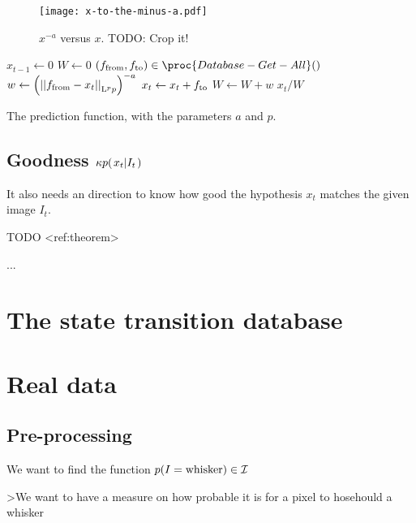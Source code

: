 \begin{figure}
  \centering
  \texttt{[image: x-to-the-minus-a.pdf]}
  \caption{$x^{-a}$ versus $x$. TODO: Crop it!}
  \label{fig:x-to-the-minus-a}
\end{figure}

\begin{table}
  \begin{codebox}
    \li $ x_{t-1} \gets 0$
    \li $ W \gets 0$
    \li \ForEach $(\tf, \tt) \in \proc{Database-Get-All}()$
    \li \Do
      \li $ w \gets \left(\Lpnorm[p]{\tf - x_t}\right)^{-a}$
      \li $ x_t \gets x_t + \tt$
      \li $ W \gets W + w$
    \End
    \li \Return $x_t / W$
  \end{codebox}
  \caption{The prediction function, with the parameters $a$ and $p$.}
  \label{alg:predict}
\end{table}



\subsection{Goodness $\kappa\cprob{x_t}{I_t}$}
It also needs an direction to know how good the hypothesis $x_t$ matches the given image $I_t$.

TODO <ref:theorem>

...

\section{The state transition database}





\section{Real data}
    \subsection{Pre-processing}

    We want to find the function $\prob{I=\text{whisker}}\in\IS$

    >We want to have a measure on how probable it is for a pixel to hosehould a whisker





